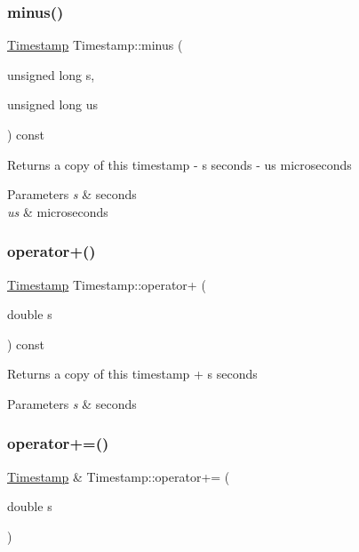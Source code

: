\subsubsection{\texorpdfstring{minus()}{minus()}}
{\footnotesize\ttfamily \mbox{\hyperlink{class_d_utils_1_1_timestamp}{Timestamp}} Timestamp\+::minus (\begin{DoxyParamCaption}\item[{unsigned long}]{s,  }\item[{unsigned long}]{us }\end{DoxyParamCaption}) const}

Returns a copy of this timestamp -\/ s seconds -\/ us microseconds 
\begin{DoxyParams}{Parameters}
{\em s} & seconds \\
\hline
{\em us} & microseconds \\
\hline
\end{DoxyParams}
\mbox{\label{class_d_utils_1_1_timestamp_a12ecf62650e5582707cf9fb30f1b2d87}} 
\subsubsection{\texorpdfstring{operator+()}{operator+()}}
{\footnotesize\ttfamily \mbox{\hyperlink{class_d_utils_1_1_timestamp}{Timestamp}} Timestamp\+::operator+ (\begin{DoxyParamCaption}\item[{double}]{s }\end{DoxyParamCaption}) const}

Returns a copy of this timestamp + s seconds 
\begin{DoxyParams}{Parameters}
{\em s} & seconds \\
\hline
\end{DoxyParams}
\mbox{\label{class_d_utils_1_1_timestamp_a609bb289c3833fd6c26c9ee831074a11}} 
\subsubsection{\texorpdfstring{operator+=()}{operator+=()}}
{\footnotesize\ttfamily \mbox{\hyperlink{class_d_utils_1_1_timestamp}{Timestamp}} \& Timestamp\+::operator+= (\begin{DoxyParamCaption}\item[{double}]{s }\end{DoxyParamCaption})}

